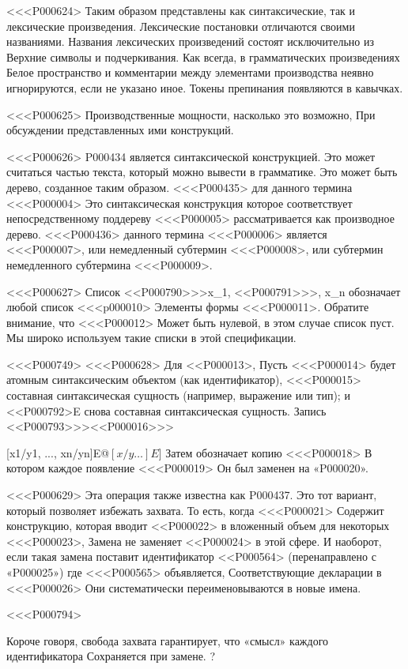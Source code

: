 {{{{{{\begin{grammar}
<<<P000624>%
Таким образом представлены как синтаксические, так и лексические произведения.
Лексические постановки отличаются своими названиями.
Названия лексических произведений состоят исключительно из
Верхние символы и подчеркивания.
Как всегда, в грамматических произведениях
Белое пространство и комментарии между элементами производства
неявно игнорируются, если не указано иное.
Токены препинания появляются в кавычках.

<<<P000625>%
Производственные мощности, насколько это возможно,
При обсуждении представленных ими конструкций.

<<<P000626>%
P000434 является синтаксической конструкцией.
Это может считаться частью текста, который можно вывести в грамматике.
Это может быть дерево, созданное таким образом.
<<<P000435> для данного термина <<<P000004> Это синтаксическая конструкция
которое соответствует непосредственному поддереву <<<P000005>
рассматривается как производное дерево.
<<<P000436> данного термина <<<P000006> является <<<P000007>,
или немедленный субтермин <<<P000008>,
или субтермин немедленного субтермина <<<P000009>.

<<<P000627>%
Список <<P000790>>>{x_1, <<P000791>>>, x_n} обозначает любой список
<<<p000010> Элементы формы <<<P000011>.
Обратите внимание, что <<<P000012> Может быть нулевой, в этом случае список пуст.
Мы широко используем такие списки в этой спецификации.

<<<P000749>%
<<<P000628>%
Для <<P000013>,
Пусть <<<P000014> будет атомным синтаксическим объектом (как идентификатор),
<<<P000015> составная синтаксическая сущность (например, выражение или тип);
и <<P000792>{E} снова составная синтаксическая сущность.
Запись
<<P000793>>>{<<P000016>>>}{[x1/y1, ..., xn/yn]E@$[x/y\ldots]E$]
Затем обозначает копию <<<P000018>
В котором каждое появление <<<P000019> Он был заменен на «P000020».

<<<P000629>%
Эта операция также известна как P000437.
Это тот вариант, который позволяет избежать захвата.
То есть, когда <<<P000021> Содержит конструкцию, которая вводит <<P000022> в
вложенный объем для некоторых <<<P000023>,
Замена не заменяет <<P000024> в этой сфере.
И наоборот, если такая замена поставит идентификатор <<P000564>
(перенаправлено с «P000025») где <<<P000565> объявляется,
Соответствующие декларации в <<<P000026> Они систематически переименовываются в новые имена.

<<<P000794>{%
Короче говоря, свобода захвата гарантирует, что «смысл» каждого идентификатора
Сохраняется при замене.%
?

}}
\end{grammar}}}}}}}
